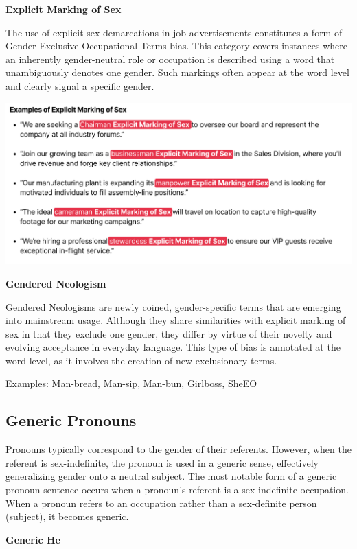 \documentclass[
]{book}
\begin{document}
{\textbf{Explicit Marking of Sex}}

The use of explicit sex demarcations in job advertisements constitutes a form of Gender-Exclusive Occupational Terms bias. This category covers instances where an inherently gender-neutral role or occupation is described using a word that unambiguously denotes one gender. Such markings often appear at the word level and clearly signal a specific gender.

\includegraphics{images/Explicit-Marking.png}

{\textbf{Gendered Neologism}}

Gendered Neologisms are newly coined, gender-specific terms that are emerging into mainstream usage. Although they share similarities with explicit marking of sex in that they exclude one gender, they differ by virtue of their novelty and evolving acceptance in everyday language. This type of bias is annotated at the word level, as it involves the creation of new exclusionary terms.

Examples: Man-bread, Man-sip, Man-bun, Girlboss, SheEO

\subsection*{Generic Pronouns}\label{generic-pronouns}

Pronouns typically correspond to the gender of their referents. However, when the referent is sex-indefinite, the pronoun is used in a generic sense, effectively generalizing gender onto a neutral subject. The most notable form of a generic pronoun sentence occurs when a pronoun's referent is a sex-indefinite occupation. When a pronoun refers to an occupation rather than a sex-definite person (subject), it becomes generic.

{\textbf{Generic He}}
\end{document}
